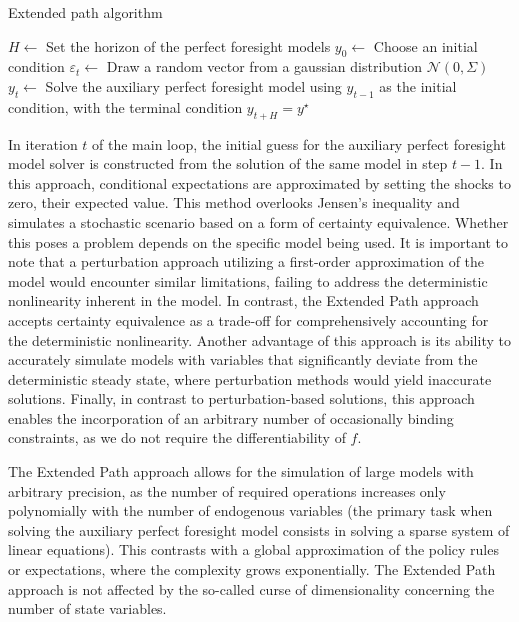 \documentclass[a4paper,11pt]{amsart}
\begin{document}
\begin{algorithm}[H]
   \caption{Extended path algorithm}
   \label{alg:ep}
   \begin{algorithmic}[1]
      \STATE $H \leftarrow$ Set the horizon of the perfect foresight models
      \STATE $y_0 \leftarrow$ Choose an initial condition
      \STATE $\varepsilon_t \leftarrow$ Draw a random vector from a gaussian distribution  $\mathcal N\left(0, \Sigma\right)$
      \STATE $y_t \leftarrow$ Solve the auxiliary perfect foresight model using \(y_{t-1}\) as the initial condition, with the terminal condition \(y_{t+H} = y^{\star}\)
      \ENDFOR
   \end{algorithmic}
\end{algorithm}

\smallskip\smallskip

In iteration \(t\) of the main loop, the initial guess for the
auxiliary perfect foresight model solver is constructed from the
solution of the same model in step \(t-1\). In this approach,
conditional expectations are approximated by setting the shocks to
zero, their expected value. This method overlooks Jensen's inequality
and simulates a stochastic scenario based on a form of certainty
equivalence. Whether this poses a problem depends on the specific
model being used. It is important to note that a perturbation approach
utilizing a first-order approximation of the model would encounter
similar limitations, failing to address the deterministic nonlinearity
inherent in the model. In contrast, the Extended Path approach accepts
certainty equivalence as a trade-off for comprehensively accounting
for the deterministic nonlinearity. Another advantage of this approach
is its ability to accurately simulate models with variables that
significantly deviate from the deterministic steady state, where
perturbation methods would yield inaccurate solutions. Finally, in
contrast to perturbation-based solutions, this approach enables the
incorporation of an arbitrary number of occasionally binding
constraints, as we do not require the differentiability
of \(f\).\newline

The Extended Path approach allows for the simulation of large models
with arbitrary precision, as the number of required operations
increases only polynomially with the number of endogenous variables
(the primary task when solving the auxiliary perfect foresight model
consists in solving a sparse system of linear equations). This
contrasts with a global approximation of the policy rules or
expectations, where the complexity grows exponentially. The Extended
Path approach is not affected by the so-called curse of dimensionality
concerning the number of state variables.\newline
\end{document}
